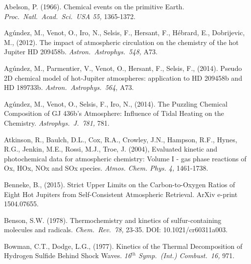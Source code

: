 \documentclass[preprint]{aastex}
\newcounter{reaction}
\begin{document}

\begin{thebibliography}{00}

Abelson, P. (1966).
Chemical events on the primitive Earth.
{\em Proc.\ Natl.\ Acad.\ Sci.\ USA 55,} 1365-1372.

Ag{\'u}ndez, M., Venot, O., Iro, N., Selsis, F., Hersant, F., H{\'e}brard, E., Dobrijevic, M., (2012).
The impact of atmospheric circulation on the chemistry of the hot Jupiter HD 209458b.
{\em Astron.\ Astrophys.\ 548,} A73.

Ag{\'u}ndez, M., Parmentier, V., Venot, O., Hersant, F., Selsis, F., (2014).
Pseudo 2D chemical model of hot-Jupiter atmospheres: application to HD 209458b and HD 189733b.
{\em Astron.\ Astrophys.\ 564,} A73.

Ag{\'u}ndez, M., Venot, O., Selsis, F., Iro, N., (2014).
 The Puzzling Chemical Composition of GJ 436b's Atmosphere: Influence of Tidal Heating on the Chemistry.
{\em Astrophys.\ J.\  781,} 781.


Atkinson, R., Baulch, D.L., Cox, R.A., Crowley, J.N., Hampson, R.F., Hynes, R.G., Jenkin, M.E., Rossi, M.J., Troe, J. (2004),
 Evaluated kinetic and photochemical data for atmospheric chemistry: Volume I - gas phase reactions of Ox, HOx, NOx and SOx species. 
 {\it Atmos. Chem. Phys.  4,} 1461-1738.

  Benneke, B., (2015).
  Strict Upper Limits on the Carbon-to-Oxygen Ratios of Eight Hot Jupiters from Self-Consistent Atmospheric Retrieval.
  ArXiv e-print 1504.07655.

Benson, S.W. (1978).
Thermochemistry and kinetics of sulfur-containing molecules and radicals.
{\em Chem.\ Rev.\ 78,} 23-35.  DOI: 10.1021/cr60311a003.

Bowman, C.T., Dodge, L.G., (1977).
Kinetics of the Thermal Decomposition of Hydrogen Sulfide Behind Shock Waves.
{\em 16$^{th}$ Symp.\ (Int.) Combust.\ 16,} 971.


\end{thebibliography}
\end{document}
